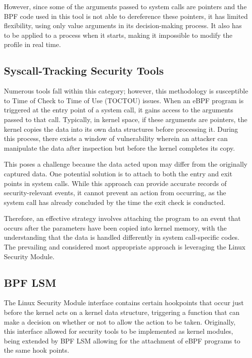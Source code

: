 However, since some of the arguments passed to system calls are pointers and the BPF code used in this tool is not able to dereference these pointers, it has limited flexibility, using only value arguments in its decision-making process. It also has to be applied to a process when it starts, making it impossible to modify the profile in real time.

\subsection{Syscall-Tracking Security Tools}

Numerous tools fall within this category; however, this methodology is susceptible to Time of Check to Time of Use (TOCTOU) issues. When an eBPF program is triggered at the entry point of a system call, it gains access to the arguments passed to that call. Typically, in kernel space, if these arguments are pointers, the kernel copies the data into its own data structures before processing it. During this process, there exists a window of vulnerability wherein an attacker can manipulate the data after inspection but before the kernel completes its copy.

This poses a challenge because the data acted upon may differ from the originally captured data. One potential solution is to attach to both the entry and exit points in system calls. While this approach can provide accurate records of security-relevant events, it cannot prevent an action from occurring, as the system call has already concluded by the time the exit check is conducted.

Therefore, an effective strategy involves attaching the program to an event that occurs after the parameters have been copied into kernel memory, with the understanding that the data is handled differently in system call-specific codes. The prevailing and considered most appropriate approach is leveraging the Linux Security Module.

\subsection{BPF LSM}

The Linux Security Module interface contains certain hookpoints that occur just before the kernel acts on a kernel data structure, triggering a function that can make a decision on whether or not to allow the action to be taken. Originally, this interface allowed for security tools to be implemented as kernel modules, being extended by BPF LSM allowing for the attachment of eBPF programs to the same hook points.

